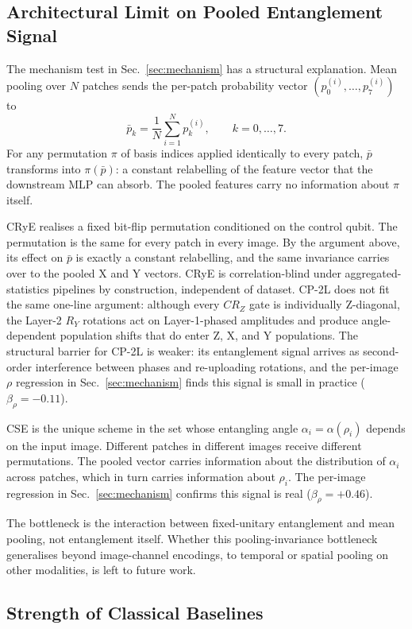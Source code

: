 \documentclass[conference,compsoc]{IEEEtran}
\begin{document}
\subsection{Architectural Limit on Pooled Entanglement Signal}
\label{sec:archlimit}

The mechanism test in Sec.~\ref{sec:mechanism} has a structural explanation. Mean pooling over $N$ patches sends the per-patch probability vector $(p_0^{(i)}, \dots, p_7^{(i)})$ to
\[
\bar{p}_k = \frac{1}{N}\sum_{i=1}^{N} p_k^{(i)}, \qquad k = 0, \dots, 7.
\]
For any permutation $\pi$ of basis indices applied identically to every patch, $\bar{p}$ transforms into $\pi(\bar{p})$: a constant relabelling of the feature vector that the downstream MLP can absorb. The pooled features carry no information about $\pi$ itself.

CRyE realises a fixed bit-flip permutation conditioned on the control qubit. The permutation is the same for every patch in every image. By the argument above, its effect on $\bar{p}$ is exactly a constant relabelling, and the same invariance carries over to the pooled X and Y vectors. CRyE is correlation-blind under aggregated-statistics pipelines by construction, independent of dataset. CP-2L does not fit the same one-line argument: although every $CR_Z$ gate is individually Z-diagonal, the Layer-2 $R_Y$ rotations act on Layer-1-phased amplitudes and produce angle-dependent population shifts that do enter Z, X, and Y populations. The structural barrier for CP-2L is weaker: its entanglement signal arrives as second-order interference between phases and re-uploading rotations, and the per-image $\rho$ regression in Sec.~\ref{sec:mechanism} finds this signal is small in practice ($\beta_\rho = -0.11$).

CSE is the unique scheme in the set whose entangling angle $\alpha_i = \alpha(\rho_i)$ depends on the input image. Different patches in different images receive different permutations. The pooled vector carries information about the distribution of $\alpha_i$ across patches, which in turn carries information about $\rho_i$. The per-image regression in Sec.~\ref{sec:mechanism} confirms this signal is real ($\beta_\rho = +0.46$).

The bottleneck is the interaction between fixed-unitary entanglement and mean pooling, not entanglement itself. Whether this pooling-invariance bottleneck generalises beyond image-channel encodings, to temporal or spatial pooling on other modalities, is left to future work.

\subsection{Strength of Classical Baselines}
\end{document}

